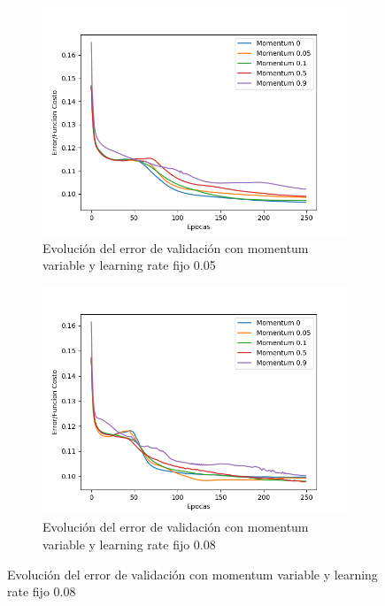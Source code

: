 \begin{figure}[!htbp]
\centering
\begin{subfigure}{.5\textwidth}
  \centering
  \includegraphics[width=1\linewidth]{graficos/ej2/eta_x_momentum_promedios_validacion_0_05.png}
  \caption{Evolución del error de validación con momentum variable y learning rate fijo 0.05}
  \label{fig:sub1}
\end{subfigure}%
\begin{subfigure}{.5\textwidth}
  \centering
  \includegraphics[width=1\linewidth]{graficos/ej2/eta_x_momentum_promedios_validacion_0_08.png}
  \caption{Evolución del error de validación con momentum variable y learning rate fijo 0.08}
  \label{fig:sub2}
\end{subfigure}
\end{figure}

